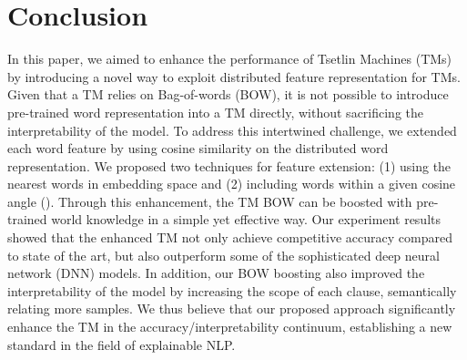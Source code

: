 \documentclass[11pt]{article}
\begin{document}
\section{Conclusion}\label{conc}
In this paper, we aimed to enhance the performance of Tsetlin Machines (TMs) by introducing a novel way to exploit distributed feature representation for TMs. Given that a TM relies on Bag-of-words (BOW), it is not possible to introduce pre-trained word representation into a TM directly, without sacrificing the interpretability of the model. To address this intertwined challenge, we extended each word feature by using cosine similarity on the distributed word representation. We proposed two techniques for feature extension: (1) using the  nearest words in embedding space and (2) including words within a given cosine angle (). Through this enhancement, the TM BOW can be boosted with pre-trained world knowledge in a simple yet effective way. Our experiment results showed that the enhanced TM not only achieve competitive accuracy compared to state of the art, but also outperform some of the sophisticated deep neural network (DNN) models. In addition, our BOW boosting  also improved the interpretability of the model by increasing the scope of each clause, semantically relating more samples. We thus believe that our proposed approach significantly enhance the TM in the accuracy/interpretability continuum, establishing a new standard in the field of explainable NLP.




\end{document}
